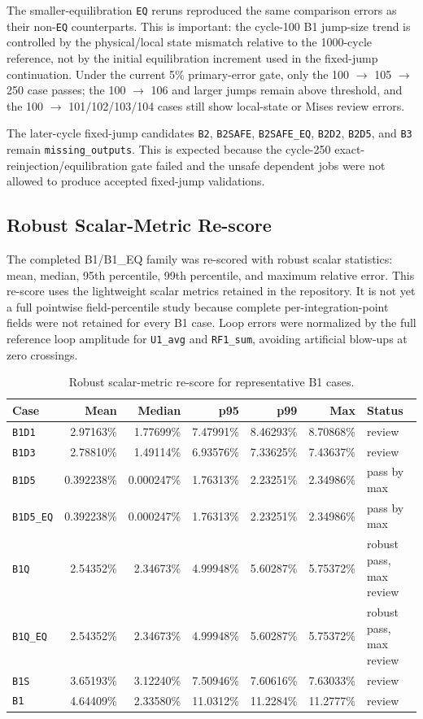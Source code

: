 \documentclass[11pt,a4paper]{article}
\newcommand{\code}[1]{\texttt{#1}}
\begin{document}
The smaller-equilibration \code{EQ} reruns reproduced the same comparison errors as their non-\code{EQ} counterparts. This is important: the cycle-100 B1 jump-size trend is controlled by the physical/local state mismatch relative to the 1000-cycle reference, not by the initial equilibration increment used in the fixed-jump continuation. Under the current 5\% primary-error gate, only the 100 $\rightarrow$ 105 $\rightarrow$ 250 case passes; the 100 $\rightarrow$ 106 and larger jumps remain above threshold, and the 100 $\rightarrow$ 101/102/103/104 cases still show local-state or Mises review errors.

The later-cycle fixed-jump candidates \code{B2}, \code{B2SAFE}, \code{B2SAFE\_EQ}, \code{B2D2}, \code{B2D5}, and \code{B3} remain \code{missing\_outputs}. This is expected because the cycle-250 exact-reinjection/equilibration gate failed and the unsafe dependent jobs were not allowed to produce accepted fixed-jump validations.

\subsection{Robust Scalar-Metric Re-score}

The completed B1/B1\_EQ family was re-scored with robust scalar statistics: mean, median, 95th percentile, 99th percentile, and maximum relative error. This re-score uses the lightweight scalar metrics retained in the repository. It is not yet a full pointwise field-percentile study because complete per-integration-point fields were not retained for every B1 case. Loop errors were normalized by the full reference loop amplitude for \code{U1\_avg} and \code{RF1\_sum}, avoiding artificial blow-ups at zero crossings.

\begin{table}[H]
\centering
\caption{Robust scalar-metric re-score for representative B1 cases.}
\begin{tabular}{lrrrrrl}
\toprule
Case & Mean & Median & p95 & p99 & Max & Status \\
\midrule
\code{B1D1} & 2.97163\% & 1.77699\% & 7.47991\% & 8.46293\% & 8.70868\% & review \\
\code{B1D3} & 2.78810\% & 1.49114\% & 6.93576\% & 7.33625\% & 7.43637\% & review \\
\code{B1D5} & 0.392238\% & 0.000247\% & 1.76313\% & 2.23251\% & 2.34986\% & pass by max \\
\code{B1D5\_EQ} & 0.392238\% & 0.000247\% & 1.76313\% & 2.23251\% & 2.34986\% & pass by max \\
\code{B1Q} & 2.54352\% & 2.34673\% & 4.99948\% & 5.60287\% & 5.75372\% & robust pass, max review \\
\code{B1Q\_EQ} & 2.54352\% & 2.34673\% & 4.99948\% & 5.60287\% & 5.75372\% & robust pass, max review \\
\code{B1S} & 3.65193\% & 3.12240\% & 7.50946\% & 7.60616\% & 7.63033\% & review \\
\code{B1} & 4.64409\% & 2.33580\% & 11.0312\% & 11.2284\% & 11.2777\% & review \\
\bottomrule
\end{tabular}
\end{table}
\end{document}
